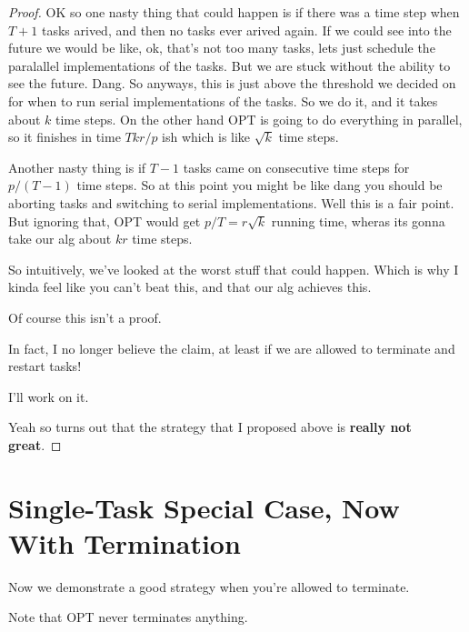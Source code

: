 \documentclass{article}[11pt]
\begin{document}
\begin{proof}
  OK so one nasty thing that could happen is if there was a time
  step when $T+1$ tasks arived, and then no tasks ever arived
  again. If we could see into the future we would be like, ok,
  that's not too many tasks, lets just schedule the paralallel
  implementations of the tasks. But we are stuck without the
  ability to see the future. Dang. So anyways, this is just above
  the threshold we decided on for when to run serial
  implementations of the tasks. So we do it, and it takes about
  $k$ time steps. On the other hand OPT is going to do
  everything in parallel, so it finishes in time $T k r / p$ ish
  which is like $\sqrt{k}$ time steps.

  Another nasty thing is if $T-1$ tasks came on consecutive time
  steps for $p/(T-1)$ time steps. So at this point you might be
  like dang you should be aborting tasks and switching to serial
  implementations. Well this is a fair point. But ignoring that,
  OPT would get $p/T = r\sqrt{k}$ running time, wheras its gonna take our alg
  about $kr$ time steps.

  So intuitively, we've looked at the worst stuff that could
  happen. Which is why I kinda feel like you can't beat this, and
  that our alg achieves this. 

  Of course this isn't a proof.

  In fact, I no longer believe the claim, at least if we are
  allowed to terminate and restart tasks! 

  I'll work on it.

Yeah so turns out that the strategy that I proposed above is
\textbf{really not great}.

\end{proof}

\section{Single-Task Special Case, Now With Termination}
Now we demonstrate a good strategy when you're allowed to
terminate.

Note that OPT never terminates anything. 
\end{document}
